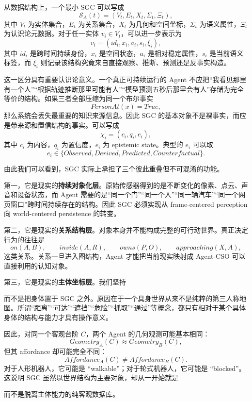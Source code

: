 从数据结构上，一个最小 SGC 可以写成
\[
\mathcal S_A(t)
=
\left(
V_t,
E_t,
X_t,
\Sigma_t,
\Xi_t
\right),
\]
其中 $V_t$ 为实体集合，$E_t$ 为关系集合，$X_t$ 为几何和空间坐标，$\Sigma_t$ 为语义属性，$\Xi_t$ 为认识论元数据。对于任一实体 $v_i\in V_t$，可以进一步表示为
\[
v_i=
\left(
id_i,
x_i,
a_i,
s_i,
\xi_i
\right),
\]
其中 $id_i$ 是跨时间持续身份，$x_i$ 是空间状态，$a_i$ 是相对稳定属性，$s_i$ 是当前语义标签，而 $\xi_i$ 则记录该结构究竟来自直接观察、推断、预测还是反事实构造。

这一区分具有重要认识论意义。一个真正可持续运行的 Agent 不应把“我看见那里有一个人”“根据轨迹推断那里可能有人”“模型预测五秒后那里会有人”存储为完全等价的结构。如果三者全部压缩为同一个布尔事实
\[
PersonAt(x)=True,
\]
那么系统会丢失最重要的知识来源信息。因此 SGC 的基本对象不是裸事实，而应是带来源和置信结构的事实。可以写成
\[
\chi_i=
\left(
c_i,
q_i,
e_i
\right),
\]
其中 $c_i$ 为内容，$q_i$ 为置信度，$e_i$ 为 epistemic state。典型的 $e_i$ 可以取
\[
e_i\in
\{
Observed,
Derived,
Predicted,
Counterfactual
\}.
\]

由此我们可以看到，SGC 实际上承担了三个彼此重叠但不可混淆的功能。

第一，它是现实的\textbf{持续对象化层}。原始传感器得到的是不断变化的像素、点云、声音和设备状态，而 Agent 需要的是“同一个门”“同一个人”“同一辆汽车”“同一个网页窗口”跨时间持续存在的结构。因此 SGC 必须实现从 frame-centered perception 向 world-centered persistence 的转变。

第二，它是现实的\textbf{关系结构层}。对象本身并不能构成完整的可行动世界。真正决定行为的往往是
\[
on(A,B),\qquad
inside(A,R),\qquad
owns(P,O),\qquad
approaching(X,A),
\]
这类关系。关系一旦进入图结构，Agent 才能把当前现实映射成 Agent-CSO 可以直接利用的认知对象。

第三，它是现实的\textbf{主体坐标层}。我们坚持
\begin{statementbox}
\centering
{}
\end{statementbox}
而不是把身体置于 SGC 之外。原因在于一个具身世界从来不是纯粹的第三人称地图。所谓“距离”“可达”“遮挡”“危险”“抓取”“通过”等概念，都只有相对于某个具体身体的结构与能力才具有操作意义。

因此，对同一个客观台阶 $C$，两个 Agent 的几何观测可能基本相同：
\[
Geometry_A(C)
\approx
Geometry_B(C),
\]
但其 affordance 却可能完全不同：
\[
Affordance_A(C)
\neq
Affordance_B(C).
\]
对于人形机器人，它可能是 ``walkable''；对于轮式机器人，它可能是 ``blocked''。这说明 SGC 虽然以世界结构为主要对象，却从一开始就是
\begin{statementbox}
\centering
{}
\end{statementbox}
而不是脱离主体能力的纯客观数据库。

